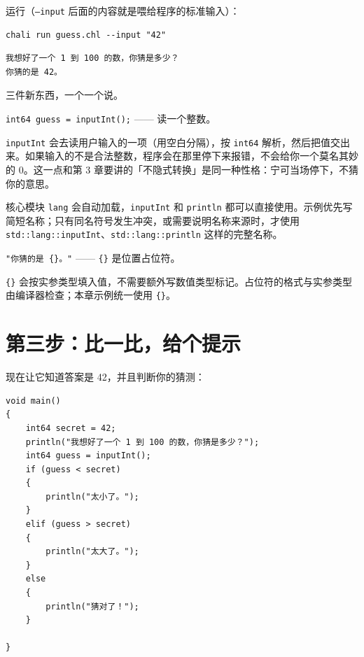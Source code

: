 运行（\texttt{--input} 后面的内容就是喂给程序的标准输入）：

\par
\medskip
\begin{lstlisting}[style=sh]
chali run guess.chl --input "42"
\end{lstlisting}
\par
\medskip

\par
\medskip
\begin{lstlisting}[style=out]
我想好了一个 1 到 100 的数，你猜是多少？
你猜的是 42。
\end{lstlisting}
\par
\medskip

三件新东西，一个一个说。

\texttt{int64 guess =\allowbreak{} input\allowbreak{}Int(\allowbreak{})\allowbreak{};} —— 读一个整数。

\texttt{input\allowbreak{}Int} 会去读用户输入的一项（用空白分隔），按 \texttt{int64} 解析，然后把值交出来。如果输入的不是合法整数，程序会在那里停下来报错，不会给你一个莫名其妙的 0。这一点和第 3 章要讲的「不隐式转换」是同一种性格：宁可当场停下，不猜你的意思。

核心模块 \texttt{lang} 会自动加载，\texttt{input\allowbreak{}Int} 和 \texttt{println} 都可以直接使用。示例优先写简短名称；只有同名符号发生冲突，或需要说明名称来源时，才使用 \texttt{std:\allowbreak{}:\allowbreak{}lang:\allowbreak{}:\allowbreak{}input\allowbreak{}Int}、\texttt{std:\allowbreak{}:\allowbreak{}lang:\allowbreak{}:\allowbreak{}println} 这样的完整名称。

\texttt{"你猜的是 \{\}。"} —— \texttt{\{\}} 是位置占位符。

\texttt{\{\}} 会按实参类型填入值，不需要额外写数值类型标记。占位符的格式与实参类型由编译器检查；本章示例统一使用 \texttt{\{\}}。

\section{第三步：比一比，给个提示}

现在让它知道答案是 42，并且判断你的猜测：

\par
\medskip
\begin{lstlisting}[style=chali]
void main()
{
    int64 secret = 42;
    println("我想好了一个 1 到 100 的数，你猜是多少？");
    int64 guess = inputInt();
    if (guess < secret)
    {
        println("太小了。");
    }
    elif (guess > secret)
    {
        println("太大了。");
    }
    else
    {
        println("猜对了！");
    }

}
\end{lstlisting}
\par
\medskip

